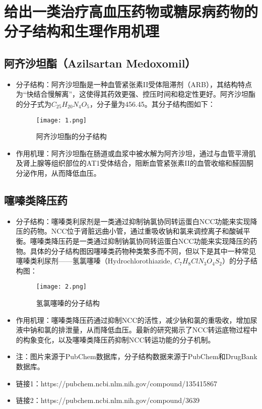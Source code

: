 \documentclass[UTF8]{report}
\theoremstyle{MyLineTheoremStyle} %
\theoremstyle{MyBlockTheoremStyle} %
\theoremstyle{MySubsubsectionStyle} %
\begin{document}
\section{给出一类治疗高血压药物或糖尿病药物的分子结构和生理作用机理}

\subsection{阿齐沙坦酯（Azilsartan Medoxomil）}

\begin{itemize}
    \item 分子结构：阿齐沙坦酯是一种血管紧张素II受体阻滞剂（ARB），其结构特点为“快结合慢解离”，这使得其药效更强、控压时间和稳定性更好。阿齐沙坦酯的分子式为$C_{25}H_{20}N_{4}O_{5}$，分子量为456.45。其分子结构图如下：
    \begin{figure}[H]
        \centering
        \texttt{[image: 1.png]}
        \caption{阿齐沙坦酯的分子结构}
        \label{fig:azilsartan}
    \end{figure}
    \item 作用机理：阿齐沙坦酯在肠道或血浆中被水解为阿齐沙坦，通过与血管平滑肌及肾上腺等组织部位的AT1受体结合，阻断血管紧张素II的血管收缩和醛固酮分泌作用，从而降低血压。
\end{itemize}

\subsection{噻嗪类降压药}

\begin{itemize}
    \item 分子结构：噻嗪类利尿剂是一类通过抑制钠氯协同转运蛋白NCC功能来实现降压的药物。NCC位于肾脏远曲小管，通过重吸收钠和氯来调控离子和酸碱平衡。噻嗪类降压药是一类通过抑制钠氯协同转运蛋白NCC功能来实现降压的药物。具体的分子结构图因噻嗪类药物种类繁多而不同，但以下是其中一种常见噻嗪类利尿剂——氢氯噻嗪（Hydrochlorothiazide, $C_{7}H_{8}ClN_{3}O_{4}S_{2}$）的分子结构图：
    \begin{figure}[H]
        \centering
        \texttt{[image: 2.png]}
        \caption{氢氯噻嗪的分子结构}
        \label{fig:hydrochlorothiazide}
    \end{figure}
    \item 作用机理：噻嗪类降压药通过抑制NCC的活性，减少钠和氯的重吸收，增加尿液中钠和氯的排泄量，从而降低血压。最新的研究揭示了NCC转运底物过程中的构象变化，以及噻嗪类降压药抑制NCC转运功能的分子机制。
\end{itemize}

\begin{itemize}
\item 注：图片来源于PubChem数据库，分子结构数据来源于PubChem和DrugBank数据库。
\item 链接1：https://pubchem.ncbi.nlm.nih.gov/compound/135415867
\item 链接2：https://pubchem.ncbi.nlm.nih.gov/compound/3639
\end{itemize}
\end{document}
